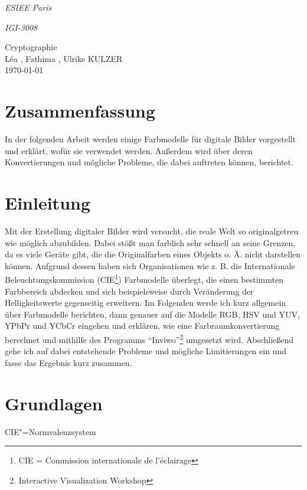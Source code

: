 \documentclass[a4paper,12pt,abstracton,titlepage]{scrartcl}
\begin{document}

{\Large\noindent \emph{ESIEE Paris}}

{\Large\noindent \emph{IGI-3008}}
\begin{center}
	{\large Cryptographie	 \\ \large Léa , Fathima , Ulrike KULZER \\ \today}
\end{center}

\setcounter{page}{1} %

\section*{Zusammenfassung}
In der folgenden Arbeit werden einige Farbmodelle für digitale Bilder vorgestellt und erklärt, wofür sie verwendet werden. Außerdem wird über deren Konvertierungen und mögliche Probleme, die dabei auftreten können, berichtet.

\section{Einleitung}
Mit der Erstellung digitaler Bilder wird versucht, die reale Welt so originalgetreu wie möglich abzubilden. Dabei stößt man farblich sehr schnell an seine Grenzen, da es viele Geräte gibt, die die Originalfarben eines Objekts o. Ä. nicht darstellen können. Aufgrund dessen haben sich Organisationen wie z. B. die Internationale Beleuchtungskommission (CIE\footnote{CIE = Commission internationale de l’éclairage}) Farbmodelle überlegt, die einen bestimmten Farbbereich abdecken und sich beispielsweise durch Veränderung der Helligkeitswerte gegenseitig erweitern. Im Folgenden werde ich kurz allgemein über Farbmodelle berichten, dann genauer auf die Modelle RGB, HSV und YUV, YPbPr und YCbCr eingehen und erklären, wie eine Farbraumkonvertierung berechnet und mithilfe des Programms "`Inviwo"'\footnote{Interactive Visualization Workshop} umgesetzt wird. Abschließend gehe ich auf dabei entstehende Probleme und mögliche Limitierungen ein und fasse das Ergebnis kurz zusammen.

\section{Grundlagen} %
\begin{floatingfigure}[r]{6cm}
	\caption{CIE"=Normvalenzsystem}
	\label{cie}
\end{floatingfigure}
\end{document}
